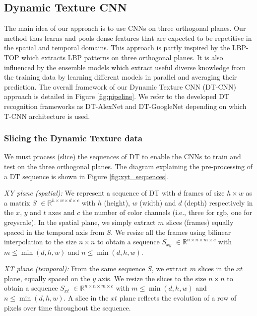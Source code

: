 \documentclass[a4paper,11pt]{article}
\newcommand{\field}[1]{\mathbb{#1}}
\newcommand{\R}{\field{R}}
\begin{document}
\subsection{Dynamic Texture CNN}%
\label{subsec:DTCNN}
The main idea of our approach is to use CNNs on three orthogonal planes.
Our method thus learns and pools dense features that are expected to be repetitive in the spatial and temporal domains.
This approach is partly inspired by the LBP-TOP \cite{zhao2007dynamic} which extracts LBP patterns on three orthogonal planes.
It is also influenced by the ensemble models \cite{hansen1990neural} which extract useful diverse knowledge from the training data by learning
different models in parallel and averaging their prediction.
The overall framework of our Dynamic Texture CNN (DT-CNN) approach is detailed in Figure \ref{fig:pipeline}.
We refer to the developed DT recognition frameworks as DT-AlexNet and DT-GoogleNet depending on which T-CNN architecture is used.

\subsubsection{Slicing the Dynamic Texture data}\leavevmode \par
We must process (slice) the sequences of DT to enable the CNNs to train and test on the three orthogonal planes. The diagram explaining the pre-processing of a DT sequence is shown in Figure \ref{fig:xyt_sequences}.

\textit{XY plane (spatial):}
We represent a sequence of DT with $d$ frames of size $h\times w$ as a matrix \textbf{$S$} $\in \R^{h\times w\times d\times c}$ with $h$ (height), $w$ (width) and $d$ (depth) respectively in the $x$, $y$ and $t$ axes and $c$ the number of color channels (i.e., three for rgb, one for greyscale).
In the spatial plane, we simply extract $m$ slices (frames) equally spaced in the temporal axis from \textbf{$S$}. We resize all the frames using bilinear interpolation to the size $n\times n$ to obtain a sequence \textbf{$S_{xy}$} $\in \R^{n\times n\times m\times c}$  with $m \leq  \min(d,h,w)$ and $n \leq \min(d,h,w)$.

\textit{XT plane (temporal):}
From the same sequence \textbf{$S$}, we extract $m$ slices in the $xt$ plane, equally spaced on the $y$ axis. We resize the slices to the size $n\times n$ to obtain a sequence \textbf{$S_{xt}$} $\in \R^{n\times n\times m\times c}$ with $m \leq \min(d,h,w)$ and $n \leq \min(d,h,w)$.
A slice in the $xt$ plane reflects the evolution of a row of pixels over time throughout the sequence.
\end{document}
